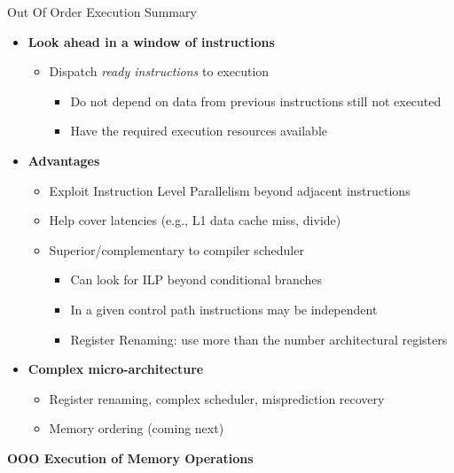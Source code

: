 \documentclass[aspectratio=169,12pt]{beamer}
\begin{document}
\begin{frame}{Out Of Order Execution Summary}
  \begin{itemize}
    \item \textbf{Look ahead in a window of instructions}
    \begin{itemize}
      \item Dispatch \emph{ready instructions} to execution
      \begin{itemize}
        \item Do not depend on data from previous instructions still not executed
        \item Have the required execution resources available
      \end{itemize}
    \end{itemize}
    
    \item \textbf{Advantages}
    \begin{itemize}
      \item Exploit Instruction Level Parallelism beyond adjacent instructions
      \item Help cover latencies (e.g., L1 data cache miss, divide)
      \item Superior/complementary to compiler scheduler
      \begin{itemize}
        \item Can look for ILP beyond conditional branches
        \item In a given control path instructions may be independent
        \item Register Renaming: use more than the number architectural registers
      \end{itemize}
    \end{itemize}
    
    \item \textbf{Complex micro-architecture}
    \begin{itemize}
      \item Register renaming, complex scheduler, misprediction recovery
      \item Memory ordering (coming next)
    \end{itemize}
  \end{itemize}
\end{frame}

\begin{frame}
  \begin{center}
    \vspace{3cm}
    {\Huge \textbf{OOO Execution of Memory Operations}}
  \end{center}
\end{frame}
\end{document}
